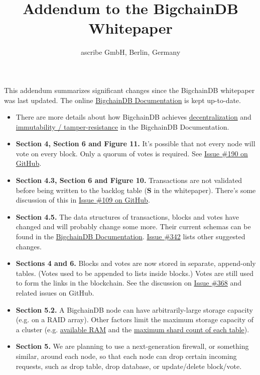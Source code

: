\documentclass[a4paper]{article}
\title{Addendum to the BigchainDB Whitepaper}
\author{ascribe GmbH, Berlin, Germany}
\begin{document}

\maketitle

This addendum summarizes significant changes since the BigchainDB white\-paper was last updated. The online \href{https://bigchaindb.readthedocs.io/}{BigchainDB Documentation} is kept up-to-date.

\begin{itemize}
  \item There are more details about how BigchainDB achieves \href{https://bigchaindb.readthedocs.io/en/latest/topic-guides/decentralized.html}{decentralization} and \href{https://bigchaindb.readthedocs.io/en/latest/topic-guides/immutable.html}{immutability / tamper-resistance} in the BigchainDB Documentation.
  \item \textbf{Section 4, Section 6 and Figure 11.} It's possible that not every node will vote on every block. Only a quorum of votes is required. See \href{https://github.com/bigchaindb/bigchaindb/issues/190}{Issue \#190 on GitHub}.
  \item \textbf{Section 4.3, Section 6 and Figure 10.} Transactions are not validated before being written to the backlog table ($\mathbf{S}$ in the whitepaper). There's some discussion of this in \href{https://github.com/bigchaindb/bigchaindb/issues/109}{Issue \#109 on GitHub}.
  \item \textbf{Section 4.5.} The data structures of transactions, blocks and votes have changed and will probably change some more. Their current schemas can be found in the \href{https://bigchaindb.readthedocs.io/en/latest/topic-guides/models.html}{BigchainDB Documentation}. \href{https://github.com/bigchaindb/bigchaindb/issues/342}{Issue \#342} lists other suggested changes.
  \item \textbf{Sections 4 and 6.} Blocks and votes are now stored in separate, append-only tables. (Votes used to be appended to lists inside blocks.) Votes are still used to form the links in the blockchain. See the discussion on \href{https://github.com/bigchaindb/bigchaindb/issues/368}{Issue \#368} and related issues on GitHub.
  \item \textbf{Section 5.2.} A BigchainDB node can have arbitrarily-large storage capacity (e.g. on a RAID array). Other factors limit the maximum storage capacity of a cluster (e.g. \href{https://bigchaindb.readthedocs.io/en/latest/nodes/node-requirements.html#memory-ram-requirements}{available RAM} and the \href{https://rethinkdb.com/limitations/}{maximum shard count of each table}).
  \item \textbf{Section 5.} We are planning to use a next-generation firewall, or something similar, around each node, so that each node can drop certain incoming requests, such as drop table, drop database, or update/delete block/vote.
\end{itemize}
\end{document}
